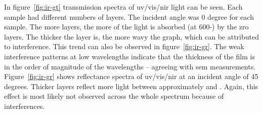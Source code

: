 In figure~\ref{fig:ir-gt} transmission spectra of \gls{uv}/\gls{vis}/\gls{nir} light can be seen. 
Each sample had different numbers of layers. 
The incident angle was 0 degree for each sample.
The more layers, the more of the light is absorbed (at 600-) by the \gls{zro} layers. 
The thicker the layer is, the more wavy the graph, which can be attributed to interference\cite{Dumin1967}.
This trend can also be observed in figure~\ref{fig:ir-gr}.
The weak interference patterns at low wavelengths indicate that the thickness of the film is in the order of magnitude of the wavelengths\cite{delimafilho2017film} -- agreeing with \gls{sem} measurements. 
%
Figure~\ref{fig:ir-gr} shows reflectance spectra of \gls{uv}/\gls{vis}/\gls{nir} at an incident angle of 45 degrees. 
Thicker layers reflect more light between approximately  and . 
Again, this effect is most likely not observed across the whole spectrum because of interferences. 


